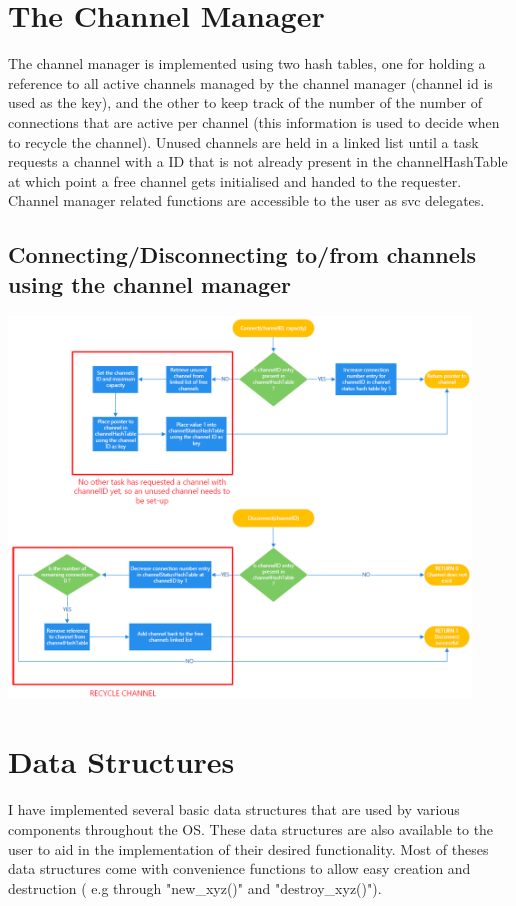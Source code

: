 \documentclass[12pt,a4paper]{article}
\begin{document}
 


\section{The Channel Manager}
The channel manager is implemented using two hash tables, one for holding a reference to all active channels managed by the channel manager (channel id is used as the key), and the other to keep track of the number of the number of connections that are active per channel (this information is used to decide when to recycle the channel). Unused channels are held in a linked list until a task requests a channel with a ID that is not already present in the channelHashTable at which point a free channel gets initialised and handed to the requester. Channel manager related functions are accessible to the user as svc delegates.

\subsection{Connecting/Disconnecting to/from channels using the channel manager}
\includegraphics[width=0.92\textwidth]{images/channelManagerOverview.png}\\

\pagebreak
\section{Data Structures}
I have implemented several basic data structures that are used by various components throughout the OS. These data structures are also available to the user to aid in the implementation of their desired functionality. Most of theses data structures come with convenience functions to allow easy creation  and destruction ( e.g through "new\_xyz()" and "destroy\_xyz()").
\end{document}

